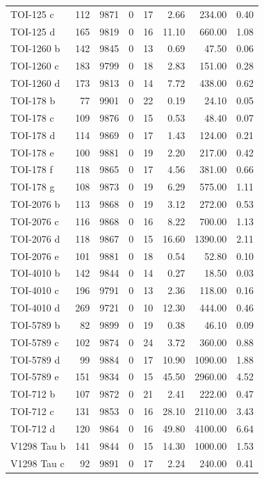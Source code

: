 \begin{table}
\begin{tabular}{lrrrrrrr}
TOI-125 c & 112 & 9871 & 0 & 17 & 2.66 & 234.00 & 0.40 \\
TOI-125 d & 165 & 9819 & 0 & 16 & 11.10 & 660.00 & 1.08 \\
TOI-1260 b & 142 & 9845 & 0 & 13 & 0.69 & 47.50 & 0.06 \\
TOI-1260 c & 183 & 9799 & 0 & 18 & 2.83 & 151.00 & 0.28 \\
TOI-1260 d & 173 & 9813 & 0 & 14 & 7.72 & 438.00 & 0.62 \\
TOI-178 b & 77 & 9901 & 0 & 22 & 0.19 & 24.10 & 0.05 \\
TOI-178 c & 109 & 9876 & 0 & 15 & 0.53 & 48.40 & 0.07 \\
TOI-178 d & 114 & 9869 & 0 & 17 & 1.43 & 124.00 & 0.21 \\
TOI-178 e & 100 & 9881 & 0 & 19 & 2.20 & 217.00 & 0.42 \\
TOI-178 f & 118 & 9865 & 0 & 17 & 4.56 & 381.00 & 0.66 \\
TOI-178 g & 108 & 9873 & 0 & 19 & 6.29 & 575.00 & 1.11 \\
TOI-2076 b & 113 & 9868 & 0 & 19 & 3.12 & 272.00 & 0.53 \\
TOI-2076 c & 116 & 9868 & 0 & 16 & 8.22 & 700.00 & 1.13 \\
TOI-2076 d & 118 & 9867 & 0 & 15 & 16.60 & 1390.00 & 2.11 \\
TOI-2076 e & 101 & 9881 & 0 & 18 & 0.54 & 52.80 & 0.10 \\
TOI-4010 b & 142 & 9844 & 0 & 14 & 0.27 & 18.50 & 0.03 \\
TOI-4010 c & 196 & 9791 & 0 & 13 & 2.36 & 118.00 & 0.16 \\
TOI-4010 d & 269 & 9721 & 0 & 10 & 12.30 & 444.00 & 0.46 \\
TOI-5789 b & 82 & 9899 & 0 & 19 & 0.38 & 46.10 & 0.09 \\
TOI-5789 c & 102 & 9874 & 0 & 24 & 3.72 & 360.00 & 0.88 \\
TOI-5789 d & 99 & 9884 & 0 & 17 & 10.90 & 1090.00 & 1.88 \\
TOI-5789 e & 151 & 9834 & 0 & 15 & 45.50 & 2960.00 & 4.52 \\
TOI-712 b & 107 & 9872 & 0 & 21 & 2.41 & 222.00 & 0.47 \\
TOI-712 c & 131 & 9853 & 0 & 16 & 28.10 & 2110.00 & 3.43 \\
TOI-712 d & 120 & 9864 & 0 & 16 & 49.80 & 4100.00 & 6.64 \\
V1298 Tau b & 141 & 9844 & 0 & 15 & 14.30 & 1000.00 & 1.53 \\
V1298 Tau c & 92 & 9891 & 0 & 17 & 2.24 & 240.00 & 0.41 \\

\end{tabular}
\end{table}
